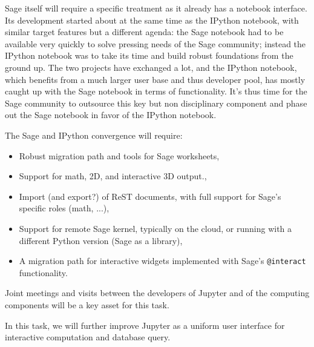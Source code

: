 \begin{workpackage}
\begin{tasklist}
\begin{task}[title=Uniform notebook interface for all interactive components,id=ipython-kernels]

  Sage itself will require a specific treatment as it already has a
  notebook interface. Its development started about at the same time
  as the IPython notebook, with similar target features but a
  different agenda: the Sage notebook had to be available very quickly
  to solve pressing needs of the Sage community; instead the IPython
  notebook was to take its time and build robust foundations from the
  ground up. The two projects have exchanged a lot, and the IPython
  notebook, which benefits from a much larger user base and thus
  developer pool, has mostly caught up with the Sage notebook in terms
  of functionality. It's thus time for the Sage community to outsource
  this key but non disciplinary component and phase out the Sage
  notebook in favor of the IPython notebook.

  The Sage and IPython convergence  will
  require:
  \begin{itemize}
  \item Robust migration path and tools for Sage worksheets,
  \item Support for math, 2D, and interactive 3D output.,
  \item Import (and export?) of ReST documents, with full support for
    Sage's specific roles (math, ...),
  \item Support for remote Sage kernel, typically on the cloud, or
    running with a different Python version (Sage as a library),
  \item A migration path for interactive widgets implemented with
    Sage's \texttt{@interact} functionality.
  \end{itemize}

  Joint meetings and visits between the developers of Jupyter and of
  the computing components will be a key asset for this task.

\end{task}

\begin{task}[title=Notebook interface usability]
  In this task, we will further improve Jupyter as a uniform user
  interface for interactive computation and database query.


\end{task}
\end{tasklist}
\end{workpackage}
